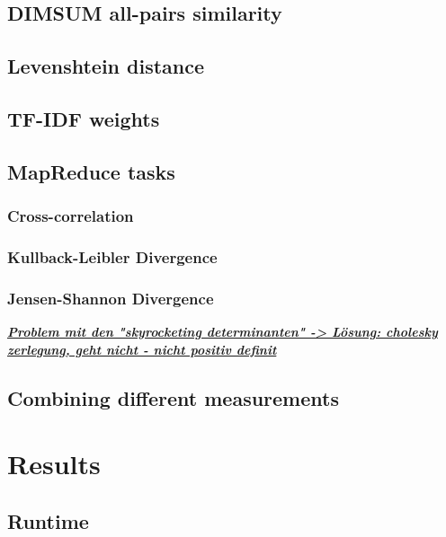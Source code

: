 \section{DIMSUM all-pairs similarity}

\section{Levenshtein distance}

\section{TF-IDF weights}

\section{MapReduce tasks}

\subsection{Cross-correlation}

\subsection{Kullback-Leibler Divergence}

\subsection{Jensen-Shannon Divergence}

\underline{\textit{\textbf{Problem mit den "skyrocketing determinanten" -> Lösung: cholesky zerlegung, geht nicht - nicht positiv definit}}}\cite[p.45]{schnitzer1}

\section{Combining different measurements}


\chapter{Results}\label{bds2}

\section{Runtime}

